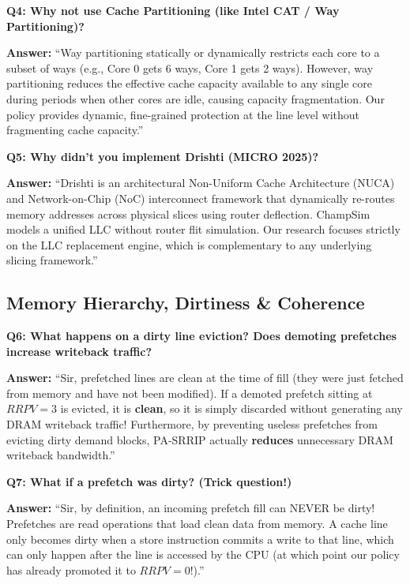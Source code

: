 \documentclass[11pt, a4paper]{article}
\begin{document}
\begin{trapbox}
\textbf{Q4: Why not use Cache Partitioning (like Intel CAT / Way Partitioning)?}
\end{trapbox}
\begin{answerbox}
\textbf{Answer:} ``Way partitioning statically or dynamically restricts each core to a subset of ways (e.g., Core 0 gets 6 ways, Core 1 gets 2 ways). However, way partitioning reduces the effective cache capacity available to any single core during periods when other cores are idle, causing capacity fragmentation. Our policy provides dynamic, fine-grained protection at the line level without fragmenting cache capacity.''
\end{answerbox}

\begin{trapbox}
\textbf{Q5: Why didn't you implement Drishti (MICRO 2025)?}
\end{trapbox}
\begin{answerbox}
\textbf{Answer:} ``Drishti is an architectural Non-Uniform Cache Architecture (NUCA) and Network-on-Chip (NoC) interconnect framework that dynamically re-routes memory addresses across physical slices using router deflection. ChampSim models a unified LLC without router flit simulation. Our research focuses strictly on the LLC replacement engine, which is complementary to any underlying slicing framework.''
\end{answerbox}

\subsection{Memory Hierarchy, Dirtiness \& Coherence}

\begin{trapbox}
\textbf{Q6: What happens on a dirty line eviction? Does demoting prefetches increase writeback traffic?}
\end{trapbox}
\begin{answerbox}
\textbf{Answer:} ``Sir, prefetched lines are clean at the time of fill (they were just fetched from memory and have not been modified). If a demoted prefetch sitting at $RRPV=3$ is evicted, it is \textbf{clean}, so it is simply discarded without generating any DRAM writeback traffic! Furthermore, by preventing useless prefetches from evicting dirty demand blocks, PA-SRRIP actually \textbf{reduces} unnecessary DRAM writeback bandwidth.''
\end{answerbox}

\begin{trapbox}
\textbf{Q7: What if a prefetch was dirty? (Trick question!)}
\end{trapbox}
\begin{answerbox}
\textbf{Answer:} ``Sir, by definition, an incoming prefetch fill can NEVER be dirty! Prefetches are read operations that load clean data from memory. A cache line only becomes dirty when a store instruction commits a write to that line, which can only happen after the line is accessed by the CPU (at which point our policy has already promoted it to $RRPV=0$!).''
\end{answerbox}
\end{document}
